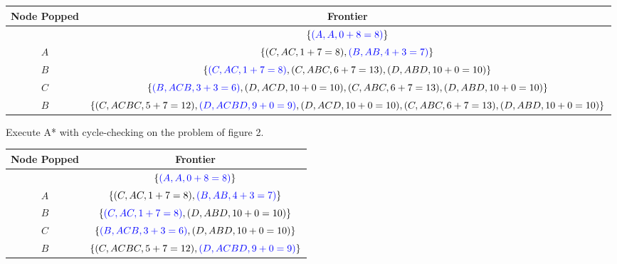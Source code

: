 \begin{listo}
\begin{table}[ht!]
        \begin{tabular}{||c|c||}
            \hline
            Node Popped & Frontier                                                                                                     \\ \hline \hline
                        & $\{ {\color{blue}(A,A, 0+8=8)} \}$                                                                           \\ \hline
            $A$         & $\{ (C,AC, 1+7=8), {\color{blue}(B,AB, 4+3=7)} \}$                                                           \\ \hline
            $B$         & $\{ {\color{blue}(C,AC, 1+7=8)}, (C,ABC, 6+7=13), (D,ABD, 10+0=10) \}$                                       \\ \hline
            $C$         & $\{ {\color{blue}(B,ACB, 3+3=6)}, (D,ACD, 10+0=10), (C,ABC, 6+7=13), (D,ABD, 10+0=10) \}$                    \\ \hline
            $B$         & $\{ (C,ACBC, 5+7=12), {\color{blue}(D,ACBD, 9+0=9)}, (D,ACD, 10+0=10), (C,ABC, 6+7=13), (D,ABD, 10+0=10) \}$ \\ \hline
        \end{tabular}
    \end{table}

    \begin{listo}
        \item Execute A* with cycle-checking on the problem of figure 2.

        \begin{solution} \begin{table}[ht!]
            \centering
        
            \begin{tabular}{||c|c||}
                \hline
                Node Popped & Frontier                                                                                                     \\ \hline \hline
                            & $\{ {\color{blue}(A,A, 0+8=8)} \}$                                                                           \\ \hline
                $A$         & $\{ (C,AC, 1+7=8), {\color{blue}(B,AB, 4+3=7)} \}$                                                           \\ \hline
                $B$         & $\{ {\color{blue}(C,AC, 1+7=8)}, (D,ABD, 10+0=10) \}$                                       \\ \hline
                $C$         & $\{ {\color{blue}(B,ACB, 3+3=6)}, (D,ABD, 10+0=10) \}$                    \\ \hline
                $B$         & $\{ (C,ACBC, 5+7=12), {\color{blue}(D,ACBD, 9+0=9)} \}$ \\ \hline
            \end{tabular}
        \end{table} \end{solution}


\end{listo}
\end{listo}
